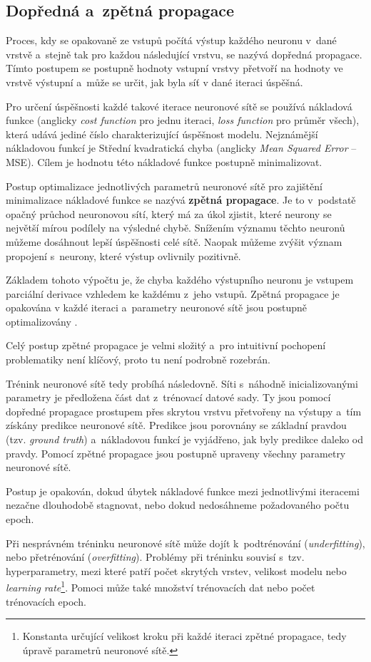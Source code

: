 \subsection{Dopředná a~zpětná propagace}
Proces, kdy se opakovaně ze vstupů počítá výstup každého neuronu v~dané vrstvě a~stejně tak pro každou následující vrstvu, se nazývá dopředná propagace. Tímto postupem se postupně hodnoty vstupní vrstvy přetvoří na hodnoty ve vrstvě výstupní a~může se určit, jak byla síť v dané iteraci úspěšná.\par
Pro určení úspěšnosti každé takové iterace neuronové sítě se používá nákladová funkce (anglicky \textit{cost function} pro jednu iteraci, \textit{loss function} pro průměr všech), která udává jediné číslo charakterizující úspěšnost modelu. Nejznámější nákladovou funkcí je Střední kvadratická chyba (anglicky \textit{Mean Squared Error} -- MSE). Cílem je hodnotu této nákladové funkce postupně minimalizovat.\par \medskip
Postup optimalizace jednotlivých parametrů neuronové sítě pro zajištění minimalizace nákladové funkce se nazývá \textbf{zpětná propagace}. Je to v~podstatě opačný průchod neuronovou sítí, který má za úkol zjistit, které neurony se největší mírou podílely na výsledné chybě. Snížením významu těchto neuronů můžeme dosáhnout lepší úspěšnosti celé sítě. Naopak můžeme zvýšit význam propojení s~neurony, které výstup ovlivnily pozitivně.\par
Základem tohoto výpočtu je, že chyba každého výstupního neuronu je vstupem parciální derivace vzhledem ke každému z~jeho vstupů. Zpětná propagace je opakována v každé iteraci a~parametry neuronové sítě jsou postupně optimalizovány \cite{neural_nets}.\par
Celý postup zpětné propagace je velmi složitý a~pro intuitivní pochopení problematiky není klíčový, proto tu není podrobně rozebrán.\par
\medskip
Trénink neuronové sítě tedy probíhá následovně. Síti s~náhodně inicializovanými parametry je předložena část dat z~trénovací datové sady. Ty jsou pomocí dopředné propagace prostupem přes skrytou vrstvu přetvořeny na výstupy a~tím získány predikce neuronové sítě. Predikce jsou porovnány se základní pravdou (tzv. \emph{ground truth}) a~nákladovou funkcí je vyjádřeno, jak byly predikce daleko od pravdy. Pomocí zpětné propagace jsou postupně upraveny všechny parametry neuronové sítě.\par
Postup je opakován, dokud úbytek nákladové funkce mezi jednotlivými iteracemi nezačne dlouhodobě stagnovat, nebo dokud nedosáhneme požadovaného počtu epoch.\par
Při nesprávném tréninku neuronové sítě může dojít k~podtrénování (\textit{underfitting}), nebo přetrénování (\textit{overfitting}). Problémy při tréninku souvisí s~tzv. hyperparametry, mezi které patří počet skrytých vrstev, velikost modelu nebo \emph{learning rate}\footnote{Konstanta určující velikost kroku při každé iteraci zpětné propagace, tedy úpravě parametrů neuronové sítě.}. Pomoci může také množství trénovacích dat nebo počet trénovacích epoch.

